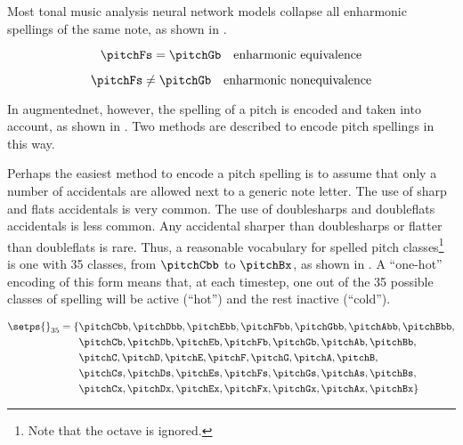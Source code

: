 
Most tonal music analysis neural network models collapse all
enharmonic spellings of the same note, as shown in
.

\begin{equation}
    \label{eq:enharmonic_equivalence}
    \pitchFs = \pitchGb \quad \text{enharmonic equivalence}
\end{equation}

\begin{equation}
    \label{eq:enharmonic_nonequivalence}
    \pitchFs \neq \pitchGb \quad \text{enharmonic nonequivalence}
\end{equation}

In \gls{augmentednet}, however, the spelling of a pitch is
encoded and taken into account, as shown in
. Two methods are described
to encode pitch spellings in this way.



Perhaps the easiest method to encode a pitch spelling is to
assume that only a number of accidentals are allowed next to
a generic note letter. The use of \gls{sharp} and
\glspl{flat} accidentals is very common. The use of
\glspl{doublesharp} and \glspl{doubleflat} accidentals is
less common. Any accidental sharper than \glspl{doublesharp}
or flatter than \glspl{doubleflat} is rare. Thus, a
reasonable vocabulary for spelled pitch
classes\footnote{Note that the octave is ignored.} is one
with 35 classes, from $\pitchCbb$ to $\pitchBx$, as shown in
. A ``one-hot'' encoding of this
form means that, at each timestep, one out of the 35
possible classes of spelling will be active (``hot'') and
the rest inactive (``cold'').

\begin{equation}
    \label{eq:pitch_spelling_35}
    \begin{split}
    \setps{}_{35} = \{ & \pitchCbb, \pitchDbb, \pitchEbb, \pitchFbb, \pitchGbb, \pitchAbb, \pitchBbb, \\
    & \pitchCb, \pitchDb, \pitchEb, \pitchFb, \pitchGb, \pitchAb, \pitchBb, \\
    & \pitchC, \pitchD, \pitchE, \pitchF, \pitchG, \pitchA, \pitchB, \\
    & \pitchCs, \pitchDs, \pitchEs, \pitchFs, \pitchGs, \pitchAs, \pitchBs, \\
    & \pitchCx, \pitchDx, \pitchEx, \pitchFx, \pitchGx, \pitchAx, \pitchBx \}
    \end{split}
\end{equation}


